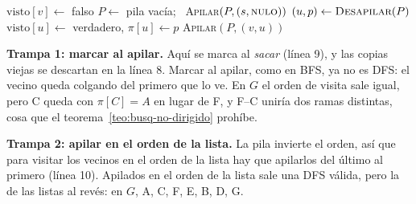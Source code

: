 \documentclass[11pt,letterpaper]{article}
\begin{document}
\begin{algorithm}[H]
\caption{\textsc{DFS-Pila}$(G, s)$: orden de visita y padres}
\label{alg:busq-dfs-pila}
\begin{algorithmic}[1]
    \State $\text{visto}[v] \gets$ falso
  \EndFor
  \State $P \gets$ pila vacía; \ \textsc{Apilar}$(P, (s, \textsc{nulo}))$
    \State $(u, p) \gets \textsc{Desapilar}(P)$
     
      \State $\text{visto}[u] \gets$ verdadero, \quad $\pi[u] \gets p$
          \State \textsc{Apilar}$(P, (v, u))$
        \EndIf
      \EndFor
    \EndIf
  \EndWhile
\EndProcedure
\end{algorithmic}
\end{algorithm}

\textbf{Trampa 1: marcar al apilar.} Aquí se marca al \textit{sacar}
(línea 9), y las copias viejas se descartan en la línea 8. Marcar al
apilar, como en BFS, ya no es DFS: el vecino queda colgando del
primero que lo ve. En $G$ el orden de visita sale igual, pero C queda
con $\pi[C] = A$ en lugar de F, y F--C uniría dos ramas distintas,
cosa que el teorema~\ref{teo:busq-no-dirigido} prohíbe.

\textbf{Trampa 2: apilar en el orden de la lista.} La pila invierte el
orden, así que para visitar los vecinos en el orden de la lista hay
que apilarlos del último al primero (línea 10). Apilados en el orden
de la lista sale una DFS válida, pero la de las listas al revés: en
$G$, A, C, F, E, B, D, G.
\end{document}
